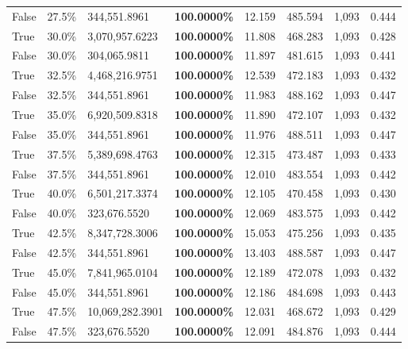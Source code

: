 \begin{table}[H]
\begin{tabular}{lllrllll}
\cline{1-8}
False & 27.5\% & 344,551.8961 & \bfseries \color{red} 100.0000\% & 12.159 & 485.594 & 1,093 & 0.444 \\
\cline{1-8}
True & 30.0\% & 3,070,957.6223 & \bfseries \color{red} 100.0000\% & 11.808 & 468.283 & 1,093 & 0.428 \\
\cline{1-8}
False & 30.0\% & \color{red} 304,065.9811 & \bfseries \color{red} 100.0000\% & 11.897 & 481.615 & 1,093 & 0.441 \\
\cline{1-8}
True & 32.5\% & 4,468,216.9751 & \bfseries \color{red} 100.0000\% & 12.539 & 472.183 & 1,093 & 0.432 \\
\cline{1-8}
False & 32.5\% & 344,551.8961 & \bfseries \color{red} 100.0000\% & 11.983 & 488.162 & 1,093 & 0.447 \\
\cline{1-8}
True & 35.0\% & 6,920,509.8318 & \bfseries \color{red} 100.0000\% & 11.890 & 472.107 & 1,093 & 0.432 \\
\cline{1-8}
False & 35.0\% & 344,551.8961 & \bfseries \color{red} 100.0000\% & 11.976 & 488.511 & 1,093 & 0.447 \\
\cline{1-8}
True & 37.5\% & 5,389,698.4763 & \bfseries \color{red} 100.0000\% & 12.315 & 473.487 & 1,093 & 0.433 \\
\cline{1-8}
False & 37.5\% & 344,551.8961 & \bfseries \color{red} 100.0000\% & 12.010 & 483.554 & 1,093 & 0.442 \\
\cline{1-8}
True & 40.0\% & 6,501,217.3374 & \bfseries \color{red} 100.0000\% & 12.105 & 470.458 & 1,093 & 0.430 \\
\cline{1-8}
False & 40.0\% & 323,676.5520 & \bfseries \color{red} 100.0000\% & 12.069 & 483.575 & 1,093 & 0.442 \\
\cline{1-8}
True & 42.5\% & 8,347,728.3006 & \bfseries \color{red} 100.0000\% & 15.053 & 475.256 & 1,093 & 0.435 \\
\cline{1-8}
False & 42.5\% & 344,551.8961 & \bfseries \color{red} 100.0000\% & 13.403 & 488.587 & 1,093 & 0.447 \\
\cline{1-8}
True & 45.0\% & 7,841,965.0104 & \bfseries \color{red} 100.0000\% & 12.189 & 472.078 & 1,093 & 0.432 \\
\cline{1-8}
False & 45.0\% & 344,551.8961 & \bfseries \color{red} 100.0000\% & 12.186 & 484.698 & 1,093 & 0.443 \\
\cline{1-8}
True & 47.5\% & 10,069,282.3901 & \bfseries \color{red} 100.0000\% & 12.031 & 468.672 & 1,093 & 0.429 \\
\cline{1-8}
False & 47.5\% & 323,676.5520 & \bfseries \color{red} 100.0000\% & 12.091 & 484.876 & 1,093 & 0.444 \\

\end{tabular}
\end{table}
